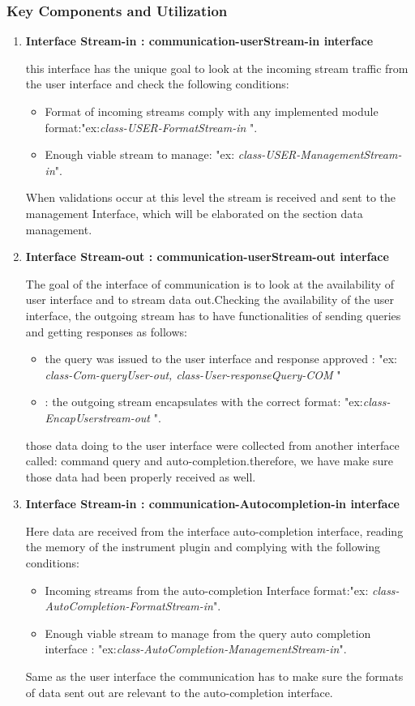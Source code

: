 \documentclass [10pt]{article}
\begin{document}
\subsubsection{Key Components and Utilization }
\begin{enumerate}
\item \textbf{Interface Stream-in : communication-userStream-in interface} \par 
this interface has the unique goal to look at the incoming stream traffic from the user interface and check the following conditions:
\begin{itemize}
\item  Format of incoming streams comply with any implemented module format:"ex:\textit{class-USER-FormatStream-in} ".
\item Enough viable stream to manage: "ex:\textit{ class-USER-ManagementStream-in}".
\end{itemize}
When validations occur at this level the stream is received and sent to the management Interface, which will be elaborated on the section data management.

\item \textbf{Interface Stream-out : communication-userStream-out interface} \par
The goal of the interface of communication is to look at the availability of user interface and  to stream data out.Checking the availability of the user interface, the outgoing stream has to have functionalities of sending queries and getting responses as follows:
\begin{itemize}
 \item  the query was issued to the user interface and response approved : "ex:\textit{ class-Com-queryUser-out, class-User-responseQuery-COM} "
\item : the outgoing stream encapsulates with the correct format: "ex:\textit{class-EncapUserstream-out} ".
\end{itemize}
those data doing to the user interface were collected from another interface called: command query and auto-completion.therefore, we have make sure those data had been properly received as well.

\item \textbf{Interface Stream-in : communication-Autocompletion-in interface} \par
Here data are received from the interface auto-completion interface, reading the memory of the instrument plugin and  complying with the following conditions:
\begin{itemize}
\item   Incoming streams from the auto-completion Interface format:"ex:\textit{ class-AutoCompletion-FormatStream-in}".
\item Enough viable stream to manage from the query auto completion interface : "ex:\textit{class-AutoCompletion-ManagementStream-in}".
\end{itemize}
Same as the user interface the communication has to make sure the formats of data sent out are relevant to the auto-completion interface.


\end{enumerate}
\end{document}
